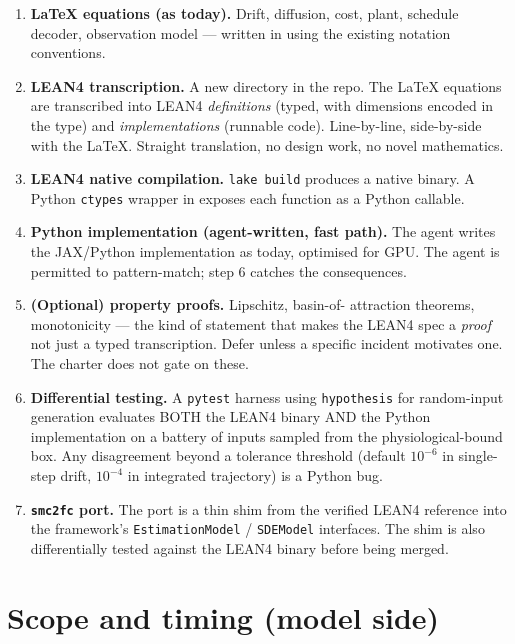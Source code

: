 \documentclass[11pt,a4paper]{article}
\begin{document}
\begin{enumerate}
\item \textbf{LaTeX equations (as today).} Drift, diffusion, cost,
  plant, schedule decoder, observation model --- written in
   using the existing notation
  conventions.
\item \textbf{LEAN4 transcription.} A new  directory in
  the repo. The LaTeX equations are transcribed into LEAN4
  \emph{definitions} (typed, with dimensions encoded in the type)
  and \emph{implementations} (runnable code). Line-by-line,
  side-by-side with the LaTeX. Straight translation, no design
  work, no novel mathematics.
\item \textbf{LEAN4 native compilation.} \texttt{lake build}
  produces a native binary. A Python \texttt{ctypes} wrapper in
   exposes each function as a Python
  callable.
\item \textbf{Python implementation (agent-written, fast path).}
  The agent writes the JAX/Python implementation as today,
  optimised for GPU. The agent is permitted to pattern-match;
  step 6 catches the consequences.
\item \textbf{(Optional) property proofs.} Lipschitz, basin-of-
  attraction theorems, monotonicity --- the kind of statement that
  makes the LEAN4 spec a \emph{proof} not just a typed transcription.
  Defer unless a specific incident motivates one. The charter does
  not gate on these.
\item \textbf{Differential testing.} A \texttt{pytest} harness using
  \texttt{hypothesis} for random-input generation evaluates BOTH the
  LEAN4 binary AND the Python implementation on a battery of inputs
  sampled from the physiological-bound box. Any disagreement beyond
  a tolerance threshold (default $10^{-6}$ in single-step drift,
  $10^{-4}$ in integrated trajectory) is a Python bug.
\item \textbf{\texttt{smc2fc} port.} The port is a thin shim from
  the verified LEAN4 reference into the framework's
  \texttt{EstimationModel} / \texttt{SDEModel} interfaces. The
  shim is also differentially tested against the LEAN4 binary
  before being merged.
\end{enumerate}

\section{Scope and timing (model side)}
\label{sec:scope-lean4}
\end{document}
